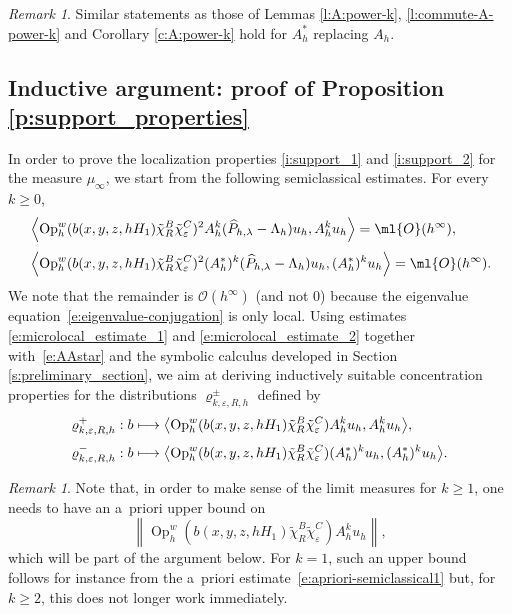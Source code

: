 \documentclass[10pt]{amsart}
\newcommand\mto{\mathchoice{\longmapsto}{\mapsto}{\mapsto}{\mapsto}}
\theoremstyle{plain}
\theoremstyle{definition}
\theoremstyle{remark}
\newtheorem{rema}[theo]{Remark}
\newcommand{\Op}{\operatorname{Op}}
\begin{document}
\begin{rema}
Similar statements as those of Lemmas \ref{l:A:power-k}, \ref{l:commute-A-power-k} and Corollary \ref{c:A:power-k} hold for $A_h^*$ replacing $A_h$.
\end{rema}

\subsection{Inductive argument: proof of Proposition \ref{p:support_properties}}

In order to prove the localization properties \eqref{i:support_1} and \eqref{i:support_2} for the measure $\mu_\infty$, we start from the following semiclassical estimates. For every $k\geq 0$,
\begin{align}
\label{e:microlocal_estimate_1}
& \left\langle \Op_h^w(b(x,y,z,hH_1)\tilde{\chi}_R^B\tilde{\chi}_\varepsilon^C)^2A_h^k(\widehat{P}_{h,\lambda}-\Lambda_h)u_h,A_h^ku_h\right\rangle = \ml{O}(h^\infty), \\[3pt]
\label{e:microlocal_estimate_2}
& \left\langle \Op_h^w(b(x,y,z,hH_1)\tilde{\chi}_R^B\tilde{\chi}_\varepsilon^C)^2(A^*_h)^k(\widehat{P}_{h,\lambda}-\Lambda_h)u_h,(A^*_h)^ku_h\right\rangle = \ml{O}(h^\infty).
\end{align}
We note that the remainder is $\mathcal{O}(h^\infty)$ (and not $0$) because the eigenvalue equation~\eqref{e:eigenvalue-conjugation} is only local. Using estimates \eqref{e:microlocal_estimate_1} and \eqref{e:microlocal_estimate_2} together with~\eqref{e:AAstar} and the symbolic calculus developed in Section \ref{s:preliminary_section}, we aim at deriving inductively suitable concentration properties for the distributions $\varrho^\pm_{k,\varepsilon,R,h}$ defined by
\begin{align*}
\varrho^+_{k,\varepsilon,R,h} & : b \mto \bigl\langle \Op_h^w(b(x,y,z,hH_1)\tilde{\chi}_R^B\tilde{\chi}_\varepsilon^C)A_h^ku_h,A_h^ku_h\bigr\rangle, \\[3pt]
\varrho_{k,\varepsilon,R,h}^-& : b \mto \bigl\langle \Op_h^w(b(x,y,z,hH_1)\tilde{\chi}_R^B\tilde{\chi}_\varepsilon^C)(A^*_h)^ku_h,(A^*_h)^k u_h\bigr\rangle.
\end{align*}
\begin{rema} Note that, in order to make sense of the limit measures for $k\geq 1$, one needs to have an a~priori upper bound on
\[
\left\| \Op_h^w(b(x,y,z,hH_1)\tilde{\chi}_R^B\tilde{\chi}_\varepsilon^C)A_h^ku_h\right\|,
\]
which will be part of the argument below. For $k=1$, such an upper bound follows for instance from the a~priori estimate~\eqref{e:apriori-semiclassical1} but, for $k\geq 2$, this does not longer work immediately.
\end{rema}
\end{document}
